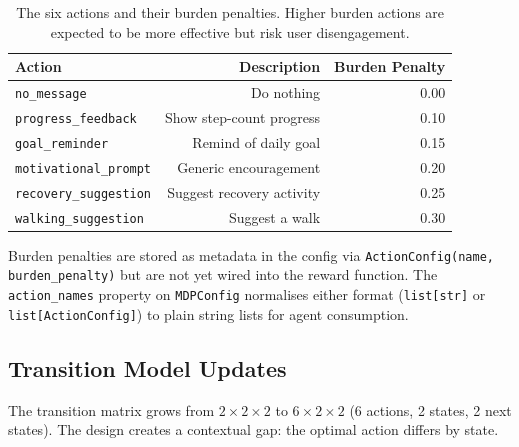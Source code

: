 \documentclass[11pt]{article}
\begin{document}
\begin{table}[h]
\centering
\begin{tabular}{lrr}
\toprule
Action & Description & Burden Penalty \\
\midrule
\texttt{no\_message} & Do nothing & 0.00 \\
\texttt{progress\_feedback} & Show step-count progress & 0.10 \\
\texttt{goal\_reminder} & Remind of daily goal & 0.15 \\
\texttt{motivational\_prompt} & Generic encouragement & 0.20 \\
\texttt{recovery\_suggestion} & Suggest recovery activity & 0.25 \\
\texttt{walking\_suggestion} & Suggest a walk & 0.30 \\
\bottomrule
\end{tabular}
\caption{The six actions and their burden penalties. Higher burden actions are expected to be more effective but risk user disengagement.}
\label{tab:actions}
\end{table}

Burden penalties are stored as metadata in the config via \texttt{ActionConfig(name, burden\_penalty)} but are not yet wired into the reward function. The \texttt{action\_names} property on \texttt{MDPConfig} normalises either format (\texttt{list[str]} or \texttt{list[ActionConfig]}) to plain string lists for agent consumption.

\subsection{Transition Model Updates}

The transition matrix grows from $2\times2\times2$ to $6\times2\times2$ (6 actions, 2 states, 2 next states). The design creates a contextual gap: the optimal action differs by state.
\end{document}
